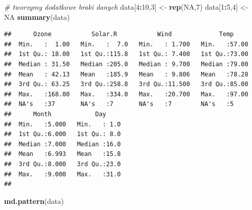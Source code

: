 \documentclass[]{book}
\newenvironment{Shaded}{\begin{snugshade}}{\end{snugshade}}
\newcommand{\CommentTok}[1]{\textcolor[rgb]{0.56,0.35,0.01}{\textit{#1}}}
\newcommand{\DecValTok}[1]{\textcolor[rgb]{0.00,0.00,0.81}{#1}}
\newcommand{\KeywordTok}[1]{\textcolor[rgb]{0.13,0.29,0.53}{\textbf{#1}}}
\newcommand{\NormalTok}[1]{#1}
\newcommand{\OperatorTok}[1]{\textcolor[rgb]{0.81,0.36,0.00}{\textbf{#1}}}
\newcommand{\OtherTok}[1]{\textcolor[rgb]{0.56,0.35,0.01}{#1}}
\newcommand{\StringTok}[1]{\textcolor[rgb]{0.31,0.60,0.02}{#1}}
\theoremstyle{plain}
\theoremstyle{definition}
\theoremstyle{definition}
\theoremstyle{definition}
\theoremstyle{definition}
\theoremstyle{remark}
\begin{document}
\begin{Shaded}
\begin{Highlighting}[]
\CommentTok{# tworzymy dodatkowe braki danych}
\NormalTok{data[}\DecValTok{4}\OperatorTok{:}\DecValTok{10}\NormalTok{,}\DecValTok{3}\NormalTok{] <-}\StringTok{ }\KeywordTok{rep}\NormalTok{(}\OtherTok{NA}\NormalTok{,}\DecValTok{7}\NormalTok{)}
\NormalTok{data[}\DecValTok{1}\OperatorTok{:}\DecValTok{5}\NormalTok{,}\DecValTok{4}\NormalTok{] <-}\StringTok{ }\OtherTok{NA}
\KeywordTok{summary}\NormalTok{(data)}
\end{Highlighting}
\end{Shaded}

\begin{verbatim}
##      Ozone           Solar.R           Wind             Temp      
##  Min.   :  1.00   Min.   :  7.0   Min.   : 1.700   Min.   :57.00  
##  1st Qu.: 18.00   1st Qu.:115.8   1st Qu.: 7.400   1st Qu.:73.00  
##  Median : 31.50   Median :205.0   Median : 9.700   Median :79.00  
##  Mean   : 42.13   Mean   :185.9   Mean   : 9.806   Mean   :78.28  
##  3rd Qu.: 63.25   3rd Qu.:258.8   3rd Qu.:11.500   3rd Qu.:85.00  
##  Max.   :168.00   Max.   :334.0   Max.   :20.700   Max.   :97.00  
##  NA's   :37       NA's   :7       NA's   :7        NA's   :5      
##      Month            Day      
##  Min.   :5.000   Min.   : 1.0  
##  1st Qu.:6.000   1st Qu.: 8.0  
##  Median :7.000   Median :16.0  
##  Mean   :6.993   Mean   :15.8  
##  3rd Qu.:8.000   3rd Qu.:23.0  
##  Max.   :9.000   Max.   :31.0  
## 
\end{verbatim}

\begin{Shaded}
\begin{Highlighting}[]
\KeywordTok{md.pattern}\NormalTok{(data)}
\end{Highlighting}
\end{Shaded}
\end{document}
